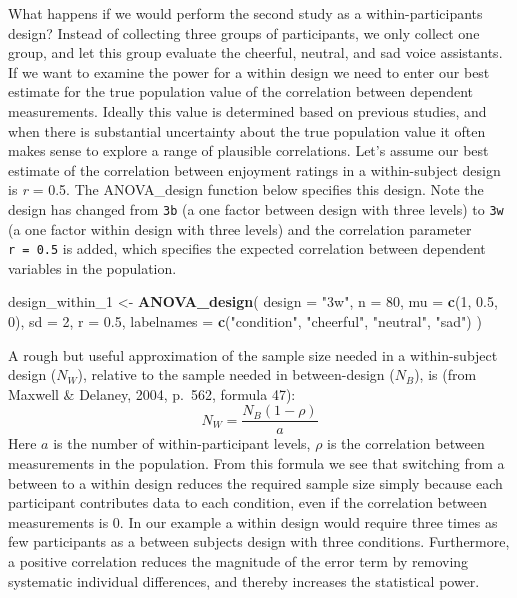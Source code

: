 \documentclass[
  ,jou,floatsintext]{apa6}
\newenvironment{Shaded}{\begin{snugshade}}{\end{snugshade}}
\newcommand{\DataTypeTok}[1]{\textcolor[rgb]{0.13,0.29,0.53}{#1}}
\newcommand{\DecValTok}[1]{\textcolor[rgb]{0.00,0.00,0.81}{#1}}
\newcommand{\FloatTok}[1]{\textcolor[rgb]{0.00,0.00,0.81}{#1}}
\newcommand{\KeywordTok}[1]{\textcolor[rgb]{0.13,0.29,0.53}{\textbf{#1}}}
\newcommand{\NormalTok}[1]{#1}
\newcommand{\StringTok}[1]{\textcolor[rgb]{0.31,0.60,0.02}{#1}}
\begin{document}
What happens if we would perform the second study as a within-participants design?
Instead of collecting three groups of participants, we only collect one group, and let this group evaluate the cheerful, neutral, and sad voice assistants.
If we want to examine the power for a within design we need to enter our best estimate for the true population value of the correlation between dependent measurements.
Ideally this value is determined based on previous studies, and when there is substantial uncertainty about the true population value it often makes sense to explore a range of plausible correlations.
Let's assume our best estimate of the correlation between enjoyment ratings in a within-subject design is \emph{r} = 0.5.
The ANOVA\_design function below specifies this design.
Note the design has changed from \texttt{3b} (a one factor between design with three levels) to \texttt{3w} (a one factor within design with three levels) and the correlation parameter \texttt{r\ =\ 0.5} is added, which specifies the expected correlation between dependent variables in the population.

\begin{Shaded}
\begin{Highlighting}[]
\NormalTok{design_within_}\DecValTok{1}\NormalTok{ <-}\StringTok{ }\KeywordTok{ANOVA_design}\NormalTok{(}
  \DataTypeTok{design =} \StringTok{"3w"}\NormalTok{, }\DataTypeTok{n =} \DecValTok{80}\NormalTok{, }\DataTypeTok{mu =} \KeywordTok{c}\NormalTok{(}\DecValTok{1}\NormalTok{, }\FloatTok{0.5}\NormalTok{, }\DecValTok{0}\NormalTok{), }
  \DataTypeTok{sd =} \DecValTok{2}\NormalTok{, }\DataTypeTok{r =} \FloatTok{0.5}\NormalTok{,}
  \DataTypeTok{labelnames =} \KeywordTok{c}\NormalTok{(}\StringTok{"condition"}\NormalTok{, }
                 \StringTok{"cheerful"}\NormalTok{, }\StringTok{"neutral"}\NormalTok{, }\StringTok{"sad"}\NormalTok{)}
\NormalTok{)}
\end{Highlighting}
\end{Shaded}

A rough but useful approximation of the sample size needed in a within-subject design (\(N_W\)), relative to the sample needed in between-design (\(N_B\)), is (from Maxwell \& Delaney, 2004, p.~562, formula 47):
\begin{equation}
N_{W}=\frac{N_{B}(1-\rho)}{a} \label{eq:within-n}
\end{equation}
Here \(a\) is the number of within-participant levels, \(\rho\) is the correlation between measurements in the population.
From this formula we see that switching from a between to a within design reduces the required sample size simply because each participant contributes data to each condition, even if the correlation between measurements is 0.
In our example a within design would require three times as few participants as a between subjects design with three conditions.
Furthermore, a positive correlation reduces the magnitude of the error term by removing systematic individual differences, and thereby increases the statistical power.
\end{document}

